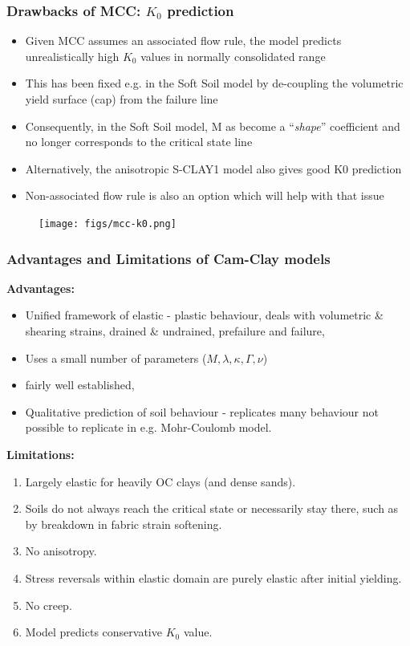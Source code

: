 \documentclass[notes]{beamer}
\begin{document}
\begin{frame}
\frametitle{Drawbacks of MCC: $K_0$ prediction}
\noindent
\fboxsep=0pt
\noindent
\begin{minipage}[t]{0.65\linewidth}
	\begin{itemize}
		\item Given MCC assumes an associated flow
		rule, the model predicts unrealistically high
		$K_0$ values in normally consolidated range
		\item This has been fixed e.g. in the Soft Soil
		model by de-coupling the volumetric yield
		surface (cap) from the failure line
		\item Consequently, in the Soft Soil model, M
		as become a ``\textit{shape}'' coefficient and no 	longer corresponds to the critical state
		line
		\item Alternatively, the anisotropic S-CLAY1
		model also gives good K0 prediction
		\item Non-associated flow rule is also an option which will help with that issue
	\end{itemize}
	
\end{minipage}%
\hfill
\begin{minipage}[t]{0.35\linewidth}
	\begin{figure}
		\texttt{[image: figs/mcc-k0.png]}
	\end{figure}
\end{minipage}	
\end{frame}

\begin{frame}
\frametitle{Advantages and Limitations of Cam-Clay models}
\textbf{Advantages:}
\begin{itemize}
	\item Unified framework of elastic - plastic behaviour, deals with volumetric \& shearing
	strains, drained \& undrained, prefailure and failure,
	\item Uses a small number of parameters ($M, \lambda, \kappa, \Gamma, \nu$)
	\item fairly well established,
	\item Qualitative prediction of soil behaviour
	- replicates many behaviour not possible to replicate in e.g. Mohr-Coulomb model.
\end{itemize}
\textbf{Limitations:}
\begin{enumerate}
	\item Largely elastic for heavily OC clays (and dense sands).
	\item Soils do not always reach the critical state or necessarily stay there, such as by
	breakdown in fabric strain softening.
	\item No anisotropy.
	\item Stress reversals within elastic domain are purely elastic after initial yielding.
	\item No creep.
	\item Model predicts conservative $K_0$ value.
\end{enumerate}
\end{frame}
\end{document}
